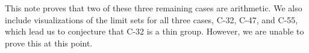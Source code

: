 \documentclass[11pt]{article}
\newcommand{\ZZ}{\mathbb{Z}}
\begin{document}

This note proves that two of these three remaining cases are arithmetic. We also include visualizations of the limit sets for all three cases, C-32, C-47, and C-55, which lead us to conjecture that C-32 is a thin group. However, we are unable to prove this at this point. 
\end{document}
